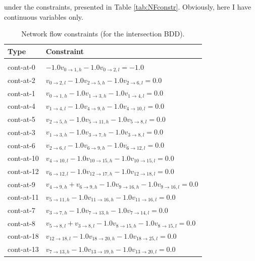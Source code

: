 \documentclass[11pt]{article}
\begin{document}
under the constraints, presented in Table \ref{tab:NFconstr}. Obviously, here I
have continuous variables only.

\begin{table}[ht]
\caption{Network flow constraints (for the intersection BDD).}
 \begin{tabular}{l l}
 \textbf{Type} & \textbf{Constraint}\\\hline\\
   cont-at-0 & $-1.0 v_{0 \rightarrow 1, h} -1.0 v_{0 \rightarrow 2, l} = -1.0$\\
   cont-at-2 & $v_{0 \rightarrow 2, l} -1.0 v_{2 \rightarrow 5, h} -1.0 v_{2 \rightarrow 6, l} = 0.0$\\
   cont-at-1 & $v_{0 \rightarrow 1, h} -1.0 v_{1 \rightarrow 3, h} -1.0 v_{1 \rightarrow 4, l} = 0.0$\\
   cont-at-4 & $v_{1 \rightarrow 4, l} -1.0 v_{4 \rightarrow 9, h} -1.0 v_{4 \rightarrow 10, l} = 0.0$\\
   cont-at-5 & $v_{2 \rightarrow 5, h} -1.0 v_{5 \rightarrow 11, h} -1.0 v_{5 \rightarrow 8, l} = 0.0$\\
   cont-at-3 & $v_{1 \rightarrow 3, h} -1.0 v_{3 \rightarrow 7, h} -1.0 v_{3 \rightarrow 8, l} = 0.0$\\
   cont-at-6 & $v_{2 \rightarrow 6, l} -1.0 v_{6 \rightarrow 9, h} -1.0 v_{6 \rightarrow 12, l} = 0.0$\\
   cont-at-10 & $v_{4 \rightarrow 10, l} -1.0 v_{10 \rightarrow 15, h} -1.0 v_{10 \rightarrow 15, l} = 0.0$\\
   cont-at-12 & $v_{6 \rightarrow 12, l} -1.0 v_{12 \rightarrow 17, h} -1.0 v_{12 \rightarrow 18, l} = 0.0$\\
   cont-at-9 & $v_{4 \rightarrow 9, h} + v_{6 \rightarrow 9, h} -1.0 v_{9 \rightarrow 16, h} -1.0 v_{9 \rightarrow 16, l} = 0.0$\\
   cont-at-11 & $v_{5 \rightarrow 11, h} -1.0 v_{11 \rightarrow 16, h} -1.0 v_{11 \rightarrow 16, l} = 0.0$\\
   cont-at-7 & $v_{3 \rightarrow 7, h} -1.0 v_{7 \rightarrow 13, h} -1.0 v_{7 \rightarrow 14, l} = 0.0$\\
   cont-at-8 & $v_{5 \rightarrow 8, l} + v_{3 \rightarrow 8, l} -1.0 v_{8 \rightarrow 15, h} -1.0 v_{8 \rightarrow 15, l} = 0.0$\\
   cont-at-18 & $v_{12 \rightarrow 18, l} -1.0 v_{18 \rightarrow 20, h} -1.0 v_{18 \rightarrow 25, l} = 0.0$\\
   cont-at-13 & $v_{7 \rightarrow 13, h} -1.0 v_{13 \rightarrow 19, h} -1.0 v_{13 \rightarrow 20, l} = 0.0$\\

\end{tabular}
\end{table}
\end{document}
